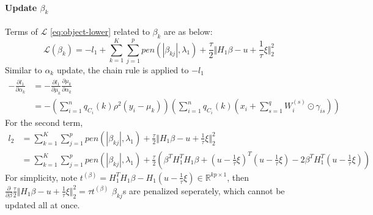 \documentclass[12pt, a4paper, oneside]{article}
\numberwithin{equation}{section}
\begin{document}
\paragraph{Update $\beta_k$}
Terms of $\mathcal{L}$ \ref{eq:object-lower} related to $\beta_k$ are as below: 
\begin{equation}
	\mathcal{L}(\beta_k) = -l_1 + \displaystyle\sum_{k=1}^{K}\sum_{j=1}^{p}pen(|\beta_{kj}|, \lambda_1) + \frac{\tau}{2}\Vert H_1\beta - u + \frac{1}{\tau}\xi\Vert_2^2
\end{equation}
Similar to $\alpha_k$ update, the chain rule is applied to $-l_1$
\begin{equation}
\label{eq:update-beta-l1}
\begin{aligned}
	-\frac{\partial l_1}{\partial \alpha_k} &= -\frac{\partial l_1}{\partial \mu_k} \frac{\partial \mu_k}{\partial \alpha_k} \\
	&= - \left(\displaystyle\sum_{i=1}^{n}q_{C_i}(k)\rho^2(y_i-\mu_k)\right)\left(\displaystyle\sum_{i=1}^{n}q_{C_i}(k)(x_i + \sum_{s=1}^{q} {W_i^{(s)}}\odot\gamma_{is})\right)
\end{aligned}
\end{equation}
For the second term,
\begin{equation}
\begin{aligned}
l_2 &= \displaystyle\sum_{k=1}^{K}\sum_{j=1}^{p}pen(|\beta_{kj}|, \lambda_1) + \frac{\tau}{2}\Vert H_1\beta - u + \frac{1}{\tau}\xi\Vert_2^2 \\
&= \displaystyle\sum_{k=1}^{K}\sum_{j=1}^{p}pen(|\beta_{kj}|, \lambda_1) + \frac{\tau}{2} \left(\beta^TH_1^TH_1\beta+(u-\frac{1}{\tau}\xi)^T(u-\frac{1}{\tau}\xi) - 2\beta^TH_1^T(u-\frac{1}{\tau}\xi)\right)
\end{aligned}
\end{equation}
For simplicity, note $t^{(\beta)} = H_1^T H_1\beta - H_1(u-\frac{1}{\tau}\xi)\in \mathbb{R}^{kp\times 1}$, then $\frac{\partial }{\partial \beta} \frac{\tau}{2}\Vert H_1\beta - u + \frac{1}{\tau}\xi\Vert_2^2= \tau t^{(\beta)}$
$\beta_{kj}$s are penalized seperately, which cannot be updated all at once. 
\end{document}

